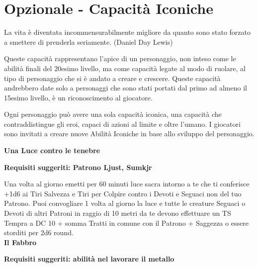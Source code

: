 \section{Opzionale - Capacità Iconiche}\hypertarget{abilitaiconiche}{}\label{abilitaiconiche}

\begin{changemargin}{0.3cm}{0.3cm}\begin{enfasi}{
La vita è diventata incommensurabilmente migliore da quanto sono stato forzato a smettere di prenderla seriamente. (Daniel Day Lewis)
}\end{enfasi}\end{changemargin}\medskip

\begin{multicols}{2}


Queste capacità rappresentano l'apice di un personaggio, non inteso come le abilità finali del 20esimo livello, ma come capacità legate al modo di ruolare, al tipo di personaggio che si è andato a creare e crescere. Queste capacità andrebbero date solo a personaggi che sono stati portati dal primo ad almeno il 15esimo livello, è un riconoscimento al giocatore.

Ogni personaggio può avere una sola capacità iconica, una capacità che contraddistingue gli eroi, capaci di azioni al limite e oltre l'umano. I giocatori sono invitati a creare nuove Abilità Iconiche in base allo sviluppo del personaggio.

\medskip

\Large\textbf{Una Luce contro le tenebre}\normalsize{}


\textbf{Requisiti suggeriti: Patrono Ljust, Sumkjr}

Una volta al giorno emetti per 60 minuti luce sacra intorno a te che ti conferisce +1d6 ai Tiri Salvezza e Tiri per Colpire contro i Devoti e Seguaci non del tuo Patrono. Puoi convogliare 1 volta al giorno la luce e tutte le creature Seguaci o Devoti di altri Patroni in raggio di 10 metri da te devono effettuare un TS Tempra a DC 10 + somma Tratti in comune con il Patrono + Saggezza o essere storditi per 2d6 round.\\

\Large\textbf{Il Fabbro}\normalsize{}

\textbf{Requisiti suggeriti: abilità nel lavorare il metallo}


\end{multicols}
